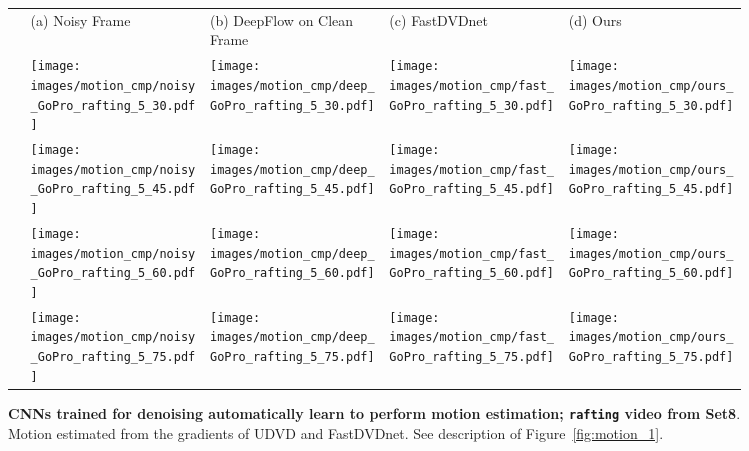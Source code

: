 \documentclass[final]{cvpr}
\begin{document}
\begin{figure*}[ht]
    \def\f1ht{\linewidth}

     \centering 
     \begin{tabular}{ >{\centering\arraybackslash}m{0.02\linewidth}
     >{\centering\arraybackslash}m{0.23\linewidth}
     >{\centering\arraybackslash}m{0.23\linewidth}
     >{\centering\arraybackslash}m{0.23\linewidth}
     >{\centering\arraybackslash}m{0.23\linewidth}
     }
     \centering
     
      &
     \footnotesize{(a) Noisy Frame} &
     \footnotesize{(b) DeepFlow on Clean Frame} &
     \footnotesize{(c) FastDVDnet} &
     \footnotesize{(d) Ours} \\
     
     30 & \texttt{[image: images/motion\_cmp/noisy\_GoPro\_rafting\_5\_30.pdf]} &
     \texttt{[image: images/motion\_cmp/deep\_GoPro\_rafting\_5\_30.pdf]} &
     \texttt{[image: images/motion\_cmp/fast\_GoPro\_rafting\_5\_30.pdf]} &
     \texttt{[image: images/motion\_cmp/ours\_GoPro\_rafting\_5\_30.pdf]} \\
     
     45 & \texttt{[image: images/motion\_cmp/noisy\_GoPro\_rafting\_5\_45.pdf]} &
     \texttt{[image: images/motion\_cmp/deep\_GoPro\_rafting\_5\_45.pdf]} &
     \texttt{[image: images/motion\_cmp/fast\_GoPro\_rafting\_5\_45.pdf]} &
     \texttt{[image: images/motion\_cmp/ours\_GoPro\_rafting\_5\_45.pdf]} \\
     
     60 & \texttt{[image: images/motion\_cmp/noisy\_GoPro\_rafting\_5\_60.pdf]} &
     \texttt{[image: images/motion\_cmp/deep\_GoPro\_rafting\_5\_60.pdf]} &
     \texttt{[image: images/motion\_cmp/fast\_GoPro\_rafting\_5\_60.pdf]} &
     \texttt{[image: images/motion\_cmp/ours\_GoPro\_rafting\_5\_60.pdf]} \\
     
     75 & \texttt{[image: images/motion\_cmp/noisy\_GoPro\_rafting\_5\_75.pdf]} &
     \texttt{[image: images/motion\_cmp/deep\_GoPro\_rafting\_5\_75.pdf]} &
     \texttt{[image: images/motion\_cmp/fast\_GoPro\_rafting\_5\_75.pdf]} &
     \texttt{[image: images/motion\_cmp/ours\_GoPro\_rafting\_5\_75.pdf]} \\
     
     \end{tabular}
     
     \vspace{0.2cm}
     
\caption{\textbf{CNNs trained for denoising automatically learn to perform motion estimation; \texttt{rafting} video from Set8}. Motion estimated from the gradients of UDVD and FastDVDnet. See description of Figure~\ref{fig:motion_1}.}
\label{fig:motion_2}
\end{figure*}
\end{document}
